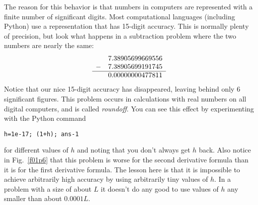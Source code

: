 The reason for this behavior is that numbers in computers are
represented with a finite number of significant digits.  Most
computational languages (including Python) use a representation that
has 15-digit accuracy. This is normally plenty of precision, but look
what happens in a subtraction problem where the two numbers are
nearly the same:
\begin{equation}
    \begin{array}{ll}
    & 7.38905699669556 \\
    - & 7.38905699191745 \\
    \hline
    &  0.00000000477811
    \end{array}
\end{equation}
Notice that our nice 15-digit accuracy has disappeared, leaving
behind only 6 significant figures. This problem occurs in
calculations with real numbers on all digital computers, and is
called {\it roundoff}.  You can see this effect by
experimenting with the Python command
\begin{Verbatim}
h=1e-17; (1+h); ans-1
\end{Verbatim}
for different values of $h$ and noting that you don't always get
$h$ back. Also notice in Fig.~\ref{f01p6} that this problem is
worse for the second derivative formula than it is for the first
derivative formula. The lesson here is that it is impossible to
achieve arbitrarily high accuracy by using arbitrarily tiny values
of $h$. In a problem with a size of about $L$ it doesn't do any
good to use values of $h$ any smaller than about $0.0001 L$.


